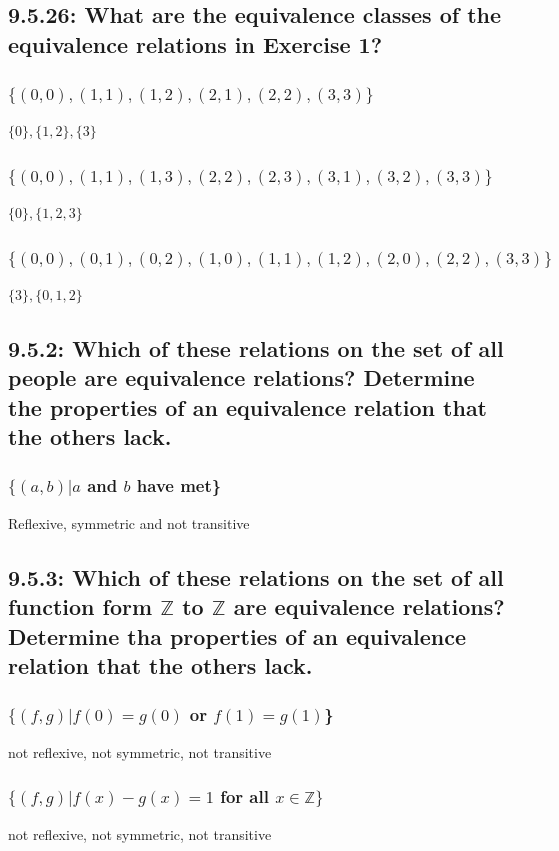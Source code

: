 \documentclass[12pt, a4paper]{report}
\begin{document}
				\subsection{9.5.26: What are the equivalence classes of the equivalence relations in Exercise 1?}
					\setcounter{subsubsection}{2}
					\subsubsection{$\{(0, 0), (1, 1), (1, 2), (2, 1), (2, 2), (3, 3)\}$}
						$\{0\},\{1,2\},\{3\}$
					\subsubsection{$\{(0, 0), (1, 1), (1, 3), (2, 2), (2, 3), (3, 1), (3, 2), (3, 3)\}$}
						$\{0\},\{1,2,3\}$
					\subsubsection{$\{(0, 0), (0, 1), (0, 2), (1, 0), (1, 1), (1, 2), (2, 0),(2, 2), (3, 3)\}$}
						$\{3\},\{0,1,2\}$
				\setcounter{subsection}{1}
				\subsection{9.5.2: Which of these relations on the set of all people are equivalence relations? Determine the properties of an equivalence relation that the others lack.}
					\setcounter{subsubsection}{3}
					\subsubsection{$\{(a,b)|a$ and $b$ have met\}}
						Reflexive, symmetric and not transitive
				\subsection{9.5.3: Which of these relations on the set of all function form $\mathbb{Z}$ to $\mathbb{Z}$ are equivalence relations? Determine tha properties of an equivalence relation that the others lack.}
					\setcounter{subsubsection}{1}
					\subsubsection{$\{(f,g)|f(0)=g(0)$ or $f(1)=g(1)$\}}
						not reflexive, not symmetric, not transitive
					\subsubsection{$\{(f,g)|f(x)-g(x)=1$ for all $x\in \mathbb{Z}\}$}
						not reflexive, not symmetric, not transitive
				\setcounter{subsection}{40}
\end{document}
